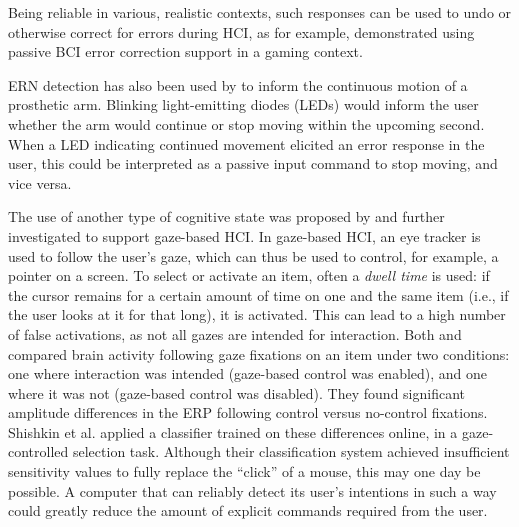 Being reliable in various, realistic contexts, such responses can be used to undo or otherwise correct for errors during HCI, as for example,  demonstrated using passive BCI error correction support in a gaming context.

ERN detection has also been used by  to inform the continuous motion of a prosthetic arm. Blinking light-emitting diodes (LEDs) would inform the user whether the arm would continue or stop moving within the upcoming second. When a LED indicating continued movement elicited an error response in the user, this could be interpreted as a passive input command to stop moving, and vice versa. 

The use of another type of cognitive state was proposed by  and further investigated  to support gaze-based HCI. In gaze-based HCI, an eye tracker is used to follow the user's gaze, which can thus be used to control, for example, a pointer on a screen. To select or activate an item, often a \emph{dwell time} is used: if the cursor remains for a certain amount of time on one and the same item (i.e., if the user looks at it for that long), it is activated.  This can lead to a high number of false activations, as not all gazes are intended for interaction. Both  and  compared brain activity following gaze fixations on an item under two conditions: one where interaction was intended (gaze-based control was enabled), and one where it was not (gaze-based control was disabled). They found significant amplitude differences in the ERP following control versus no-control fixations. Shishkin et al. applied a classifier trained on these differences online, in a gaze-controlled selection task. Although their classification system achieved insufficient sensitivity values to fully replace the ``click'' of a mouse, this may one day be possible. A computer that can reliably detect its user's intentions in such a way could greatly reduce the amount of explicit commands required from the user. 

